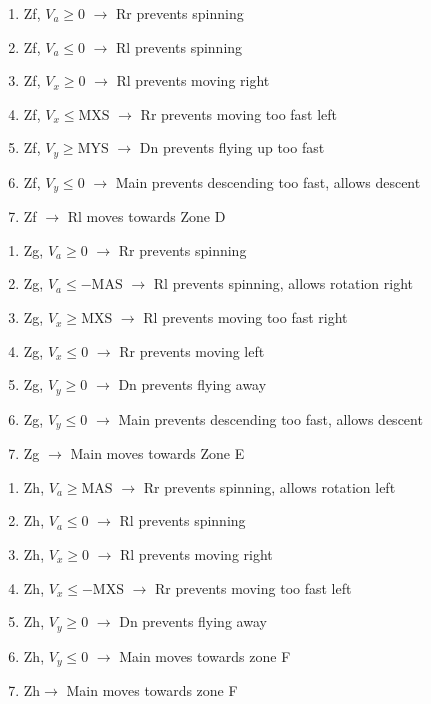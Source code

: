 \documentclass{article}
\begin{document}
\begin{enumerate}
    \item Zf, $V_a \geq 0$ $\rightarrow$ Rr \hfill prevents spinning
    \item Zf, $V_a \leq 0$ $\rightarrow$ Rl \hfill prevents spinning
    \item Zf, $V_x \geq 0$ $\rightarrow$ Rl \hfill prevents moving right
    \item Zf, $V_x \leq \text{MXS}$ $\rightarrow$ Rr \hfill prevents moving too fast left
    \item Zf, $V_y \geq \text{MYS}$ $\rightarrow$ Dn \hfill prevents flying up too fast
    \item Zf, $V_y \leq 0$ $\rightarrow$ Main \hfill prevents descending too fast, allows descent
     \item Zf $\rightarrow$ Rl \hfill moves towards Zone D
\end{enumerate}
    
\begin{enumerate}
    \item Zg, $V_a \geq 0$ $\rightarrow$ Rr \hfill prevents spinning
    \item Zg, $V_a \leq -\text{MAS}$ $\rightarrow$ Rl \hfill prevents spinning, allows rotation right
    \item Zg, $V_x \geq \text{MXS}$ $\rightarrow$ Rl \hfill prevents moving too fast right
    \item Zg, $V_x \leq 0$ $\rightarrow$ Rr \hfill prevents moving left
    \item Zg, $V_y \geq 0$ $\rightarrow$ Dn \hfill prevents flying away
    \item Zg, $V_y \leq 0$ $\rightarrow$ Main \hfill prevents descending too fast, allows descent
    \item Zg $\rightarrow$ Main \hfill moves towards Zone E
    \end{enumerate}
    
\begin{enumerate}
    \item Zh, $V_a \geq \text{MAS}$ $\rightarrow$ Rr \hfill prevents spinning, allows rotation left
    \item Zh, $V_a \leq 0$ $\rightarrow$ Rl \hfill prevents spinning
    \item Zh, $V_x \geq 0$ $\rightarrow$ Rl \hfill prevents moving right
    \item Zh, $V_x \leq -\text{MXS}$ $\rightarrow$ Rr \hfill prevents moving too fast left
    \item Zh, $V_y \geq 0$ $\rightarrow$ Dn \hfill prevents flying away
    \item Zh, $V_y \leq 0$ $\rightarrow$ Main \hfill moves towards zone F
    \item Zh$\rightarrow$ Main \hfill moves towards zone F
\end{enumerate}
\end{document}

